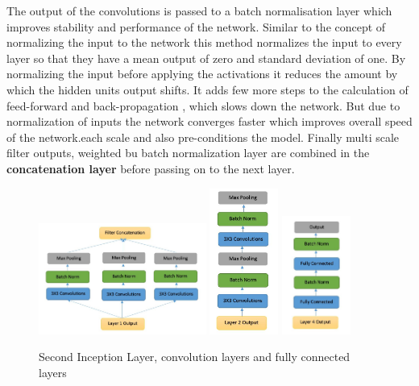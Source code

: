 \documentclass[fleqn,10pt]{SelfArx} %
\begin{document}
The output of the convolutions is passed to a batch normalisation layer which improves stability and performance of the network. Similar to the concept of
normalizing the input to the network this method normalizes the input to every layer so that they have a mean output of zero and standard deviation of one. By normalizing the input before applying the activations it reduces the amount by which the hidden units output shifts. It adds few more steps to the calculation of feed-forward and back-propagation , which slows down the network. But due to normalization of inputs the network converges faster which improves overall speed of the network.each scale and also pre-conditions the model.
\newline
Finally multi scale filter outputs, weighted bu batch normalization layer are combined in the \textbf{concatenation layer} before passing on to the next layer.
\begin{figure}[ht]\centering
\includegraphics[width=0.49\textwidth]{second_layer}
\includegraphics[width=0.20\textwidth]{3rd_4th_layer}
\includegraphics[width=0.20\textwidth]{final_layer}
\caption{Second Inception Layer, convolution layers and fully connected layers}
\label{fig:second_layer}
\end{figure}
\end{document}
